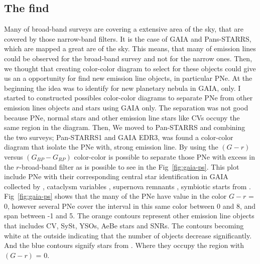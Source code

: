 \documentclass[fleqn,usenatbib]{mnras}
\begin{document}
\subsection{The find}
\label{sec:find}

Many of broad-band surveys are covering a extensive area of the sky, that
are covered by those narrow-band filters. It is the case of GAIA and Pans-STARRS, which
are mapped a great are of the sky.
This means, that many of emission lines could be observed for the broad-band
survey and not for the narrow ones. Then, we thought that creating color-color
diagram to select for these objects
could give us an a opportunity for find new emission line objects, in particular PNe.
At the beginning the idea was to identify for new planetary nebula in GAIA, only.
I started to constructed possibles color-color diagrams to separate PNe from
other emission lines objects and stars using GAIA only. The separation was not
good because PNe, normal stars and other emission line stars like CVs occupy the
same region in the diagram. Then, We moved to Pan-STARRS and combining the two
surveys; Pan-STARRS1 and GAIA EDR3, was found a color-color diagram that isolate the PNe
with, strong \ha{} emission line. By using the \((G - r)\) versus \((G_{BP} - G_{RP})\)
color-color is possible to separate those PNe with excess in the $r$-broad-band
filter as is possible to see in the Fig~\ref{fig:gaia-ps}. This plot include PNe
with their corresponding central star identification in GAIA collected by \citet{Gonzalez:2021}, 
cataclysm variables \citep{Downes:2006}, supernova remnants \citep{Green:2019}, symbiotic starts
from \citet{Akras:2019a}.  
Fig~\ref{fig:gaia-ps} shows that the many of the PNe have value in
the color \(G - r\) = 0, however several PNe cover the interval in this
same color between 0 and 8, and span between -1 and 5.
The orange contours represent other emission line objects that includes CV, SySt,
YSOs, AeBe stars and SNRs. The contours becoming white at the outside indicating
that the number of objects decrease significantly. And the blue contours signify
stars from \citet{Smart:2021}. Where they occupy the region with \((G - r)\) = 0.
\end{document}
